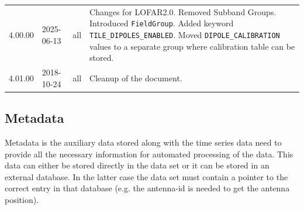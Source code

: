 \documentclass[a4paper,10pt,bibtotoc]{scrartcl}
\begin{document}
\begin{center}
  \tablelasttail{\hline}
  \begin{supertabular}{lllp{9.5cm}}
    4.00.00 & 2025-06-13 & all   & Changes for LOFAR2.0. Removed Subband Groups. Introduced \texttt{FieldGroup}. Added keyword \texttt{TILE\_DIPOLES\_ENABLED}. Moved \texttt{DIPOLE\_CALIBRATION} values to a separate group where calibration table can be stored. \\
    4.01.00 & 2018-10-24 & all   & Cleanup of the document. \\
 \end{supertabular}
\end{center}


\subsection{Metadata}
\label{sec:metadata}

Metadata is the auxiliary data stored along with the time series data need to
provide all the necessary information for automated processing of the data.
This data can either be stored directly in the data set or it can be stored
in an external database. In the latter case the data set must contain a
pointer to the correct entry in that database (e.g. the antenna-id is needed
to get the antenna position).
\end{document}

